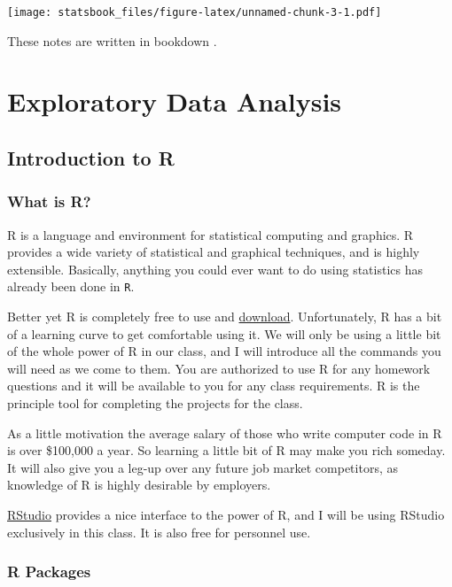 \documentclass[
]{book}
\theoremstyle{definition}
\theoremstyle{definition}
\theoremstyle{definition}
\theoremstyle{definition}
\theoremstyle{remark}
\begin{document}
\texttt{[image: statsbook\_files/figure-latex/unnamed-chunk-3-1.pdf]}

These notes are written in bookdown \citep{R-bookdown}.

\hypertarget{part-exploratory-data-analysis}{%
\part{Exploratory Data Analysis}\label{part-exploratory-data-analysis}}

\hypertarget{introduction-to-r}{%
\chapter{Introduction to R}\label{introduction-to-r}}

\hypertarget{what-is-r}{%
\section{What is R?}\label{what-is-r}}

R is a language and environment for statistical computing and graphics. R provides a wide variety of statistical and graphical techniques, and is highly extensible. Basically, anything you could ever want to do using statistics has already been done in \texttt{R}.

Better yet R is completely free to use and \href{https://cloud.r-project.org/}{download}. Unfortunately, R has a bit of a learning curve to get comfortable using it. We will only be using a little bit of the whole power of R in our class, and I will introduce all the commands you will need as we come to them. You are authorized to use R for any homework questions and it will be available to you for any class requirements. R is the principle tool for completing the projects for the class.

As a little motivation the average salary of those who write computer code in R is over \$100,000 a year. So learning a little bit of R may make you rich someday. It will also give you a leg-up over any future job market competitors, as knowledge of R is highly desirable by employers.

\href{https://www.rstudio.com/products/rstudio/download/\#\#download}{RStudio} provides a nice interface to the power of R, and I will be using RStudio exclusively in this class. It is also free for personnel use.

\hypertarget{r-packages}{%
\section{R Packages}\label{r-packages}}
\end{document}
